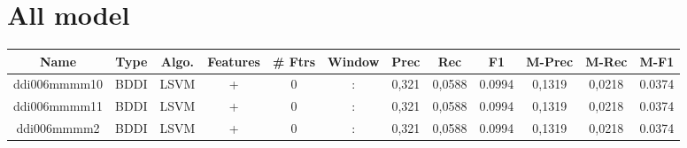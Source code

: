 \documentclass[a4paper]{article}
\begin{document}
\begin{landscape}
\begin{center}
\begin{tabular}{ |c|c|c|c|c|c|c|c|c|c|c|c|}
 	
 
 	
 
 	
 
 	
 
 	
 
 	
 
 	
 
 	
 
 	
 
 	
 
 	
 
 	
 
 	
 
 	
 
 	
 
 	
 
 	
 
 	
 
 	
 
 	
 
 	
 
 	
 
 	
 
 	
 
 	
 
 	
 
 	
 
 \hline
\end{tabular}
\end{center}



\section{All model }


\begin{center}
\begin{tabular}{ |c|c|c|c|c|c|c|c|c|c|c|c|} 
 \hline
 	Name & Type & Algo. & Features & \# Ftrs & Window & Prec & Rec & F1 & M-Prec & M-Rec & M-F1\\
 \hline
 
 	
 	\small{ ddi006mmmm10 } & BDDI & LSVM & +  &  0 &  :  &  0,321 & 0,0588 & 0.0994  &  0,1319 & 0,0218 & 0.0374 \\
 	

 
 	
 	\small{ ddi006mmmm11 } & BDDI & LSVM & +  &  0 &  :  &  0,321 & 0,0588 & 0.0994  &  0,1319 & 0,0218 & 0.0374 \\
 	

 
 	
 	\small{ ddi006mmmm2 } & BDDI & LSVM & +  &  0 &  :  &  0,321 & 0,0588 & 0.0994  &  0,1319 & 0,0218 & 0.0374 \\
 	


\end{tabular}
\end{center}
\end{landscape}
\end{document}
